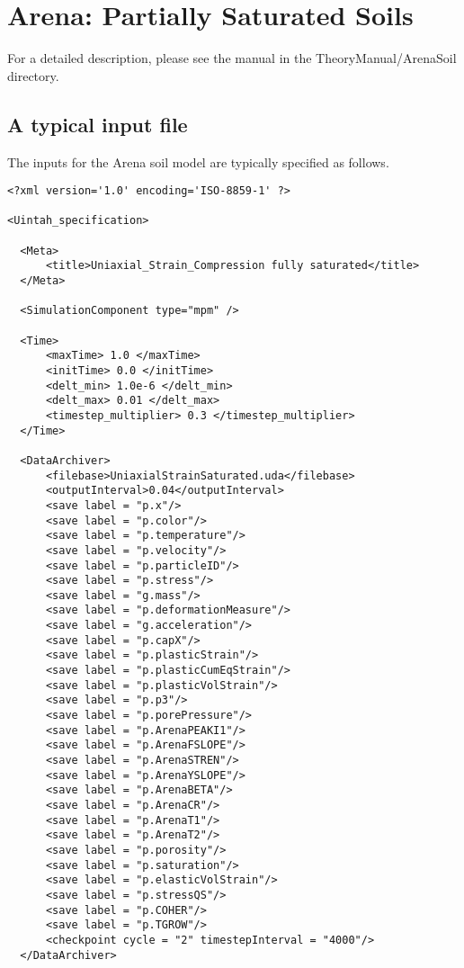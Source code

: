 \section{Arena: Partially Saturated Soils}

For a detailed description, please see
the manual in the \textsf{TheoryManual/ArenaSoil} directory.

\subsection{A typical input file}
The inputs for the Arena soil model are typically specified as follows.
\lstset{
  language=XML
}
\begin{lstlisting}
<?xml version='1.0' encoding='ISO-8859-1' ?>

<Uintah_specification>

  <Meta>
      <title>Uniaxial_Strain_Compression fully saturated</title>
  </Meta>

  <SimulationComponent type="mpm" />

  <Time>
      <maxTime> 1.0 </maxTime>
      <initTime> 0.0 </initTime>
      <delt_min> 1.0e-6 </delt_min>
      <delt_max> 0.01 </delt_max>
      <timestep_multiplier> 0.3 </timestep_multiplier>
  </Time>

  <DataArchiver>
      <filebase>UniaxialStrainSaturated.uda</filebase>
      <outputInterval>0.04</outputInterval>
      <save label = "p.x"/>
      <save label = "p.color"/>
      <save label = "p.temperature"/>
      <save label = "p.velocity"/>
      <save label = "p.particleID"/>
      <save label = "p.stress"/>
      <save label = "g.mass"/>
      <save label = "p.deformationMeasure"/>
      <save label = "g.acceleration"/>
      <save label = "p.capX"/>
      <save label = "p.plasticStrain"/>
      <save label = "p.plasticCumEqStrain"/>
      <save label = "p.plasticVolStrain"/>
      <save label = "p.p3"/>
      <save label = "p.porePressure"/>
      <save label = "p.ArenaPEAKI1"/>
      <save label = "p.ArenaFSLOPE"/>
      <save label = "p.ArenaSTREN"/>
      <save label = "p.ArenaYSLOPE"/>
      <save label = "p.ArenaBETA"/>
      <save label = "p.ArenaCR"/>
      <save label = "p.ArenaT1"/>
      <save label = "p.ArenaT2"/>
      <save label = "p.porosity"/>
      <save label = "p.saturation"/>
      <save label = "p.elasticVolStrain"/>
      <save label = "p.stressQS"/>
      <save label = "p.COHER"/>
      <save label = "p.TGROW"/>
      <checkpoint cycle = "2" timestepInterval = "4000"/>
  </DataArchiver>


\end{lstlisting}
